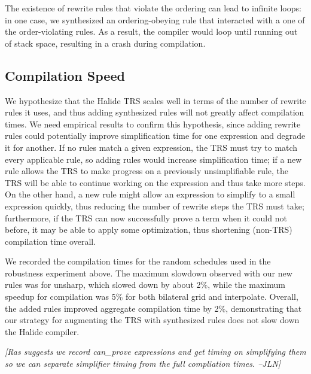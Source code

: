 \documentclass[sigplan,10pt,review,anonymous]{acmart}\settopmatter{printfolios=true,printccs=false,printacmref=false}
\newcommand{\jln}[1]{\textcolor{uwpurple}{\textit{[{#1} --JLN]}}}
\newcommand{\NumOrderingProblems}{{\color{red} 46}\xspace}
\begin{document}
The existence of rewrite rules that violate the ordering can lead
to infinite loops: in one case, we synthesized an ordering-obeying rule that interacted
with a one of the order-violating rules.  As a result, the compiler
would loop until running out of stack space, resulting in a crash
during compilation.

\subsection{Compilation Speed}
\label{ssec:compilationspeed}

We hypothesize that the Halide TRS scales well in terms of the number of
rewrite rules it uses, and thus adding synthesized rules will not greatly affect
compilation times. We need empirical results to confirm this hypothesis, since
adding rewrite rules could potentially improve simplification time for one
expression and degrade it for another. If no rules match a given expression, the
TRS must try to match every applicable rule, so adding rules would
increase simplification time; if a new rule allows the TRS to make
progress on a previously unsimplifiable rule, the TRS will be able to
continue working on the expression and thus take more steps. On the other hand,
a new rule might allow an expression to simplify to a small expression quickly,
thus reducing the number of rewrite steps the TRS must take; furthermore,
if the TRS can now successfully prove a term when it could not before, it
may be able to apply some optimization, thus shortening (non-TRS)
compilation time overall.

We recorded the compilation times for the random schedules used in the robustness experiment above.
The maximum slowdown observed with our new rules was for unsharp, which slowed down
by about 2\%, while the maximum speedup for compilation was 5\% for both bilateral grid
and interpolate.  Overall, the added rules improved aggregate compilation time by 2\%,
demonstrating that our strategy for augmenting the TRS with synthesized rules does
not slow down the Halide compiler.

\jln{Ras suggests we record can\_prove expressions and get timing on simplifying them so we can separate simplifier timing from the full compliation times.}
\end{document}
